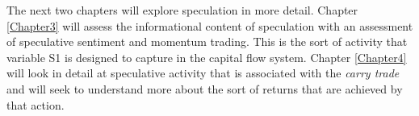 \documentclass[12pt, a4paper, oneside]{article}\usepackage[]{graphicx}\usepackage[]{color}
\begin{document}
The next two chapters will explore speculation in more detail.  Chapter \ref{Chapter3} will assess the informational content of speculation with an assessment of speculative sentiment and momentum trading. This is the sort of activity that variable S1 is designed to capture in the capital flow system.  Chapter \ref{Chapter4} will look in detail at speculative activity that is associated with the \emph{carry trade} and will seek to understand more about the sort of returns that are achieved by that action. 




\begin{appendices}

\end{appendices}
\end{document}
